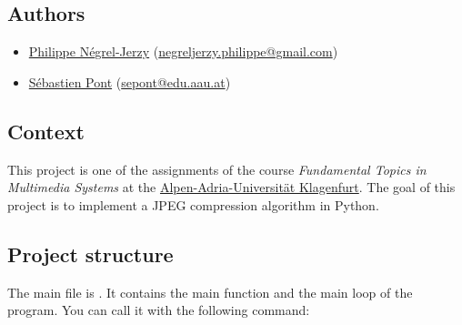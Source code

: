 \subsection{Authors}

\begin{itemize}
    \item \href{https://github.com/BSoDium}{Philippe Négrel-Jerzy} (\href{mailto:negreljerzy.philippe@gmail.com}{negreljerzy.philippe@gmail.com})
    \item \href{https://github.com/seba1204}{Sébastien Pont} (\href{mailto:sepont@edu.aau.at}{sepont@edu.aau.at})
\end{itemize}

\subsection{Context}

This project is one of the assignments of the course \textit{Fundamental Topics in Multimedia Systems} at the \href{https://www.aau.at/en/}{Alpen-Adria-Universität Klagenfurt}.
The goal of this project is to implement a JPEG compression algorithm in Python.

\subsection{Project structure}

The main file is . It contains the main function and the main
loop of the program.
You can call it with the following command:

